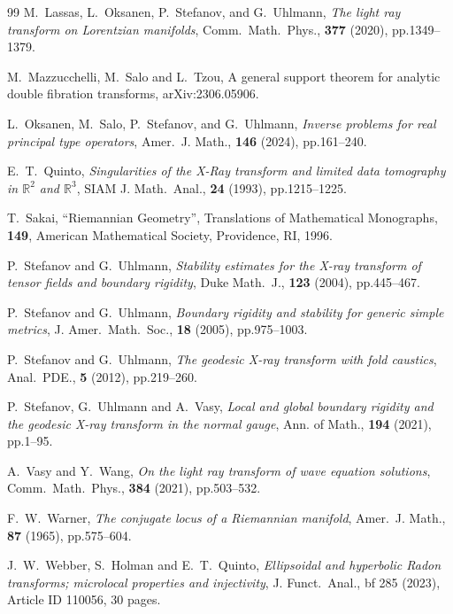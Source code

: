 \documentclass[a4paper,11pt,reqno]{amsart}
\theoremstyle{definition}
\theoremstyle{remark}
\begin{document}
\begin{thebibliography}{99}
M.~Lassas, L.~Oksanen, P.~Stefanov, and G.~Uhlmann, 
{\it The light ray transform on Lorentzian manifolds}, 
Comm.\ Math.\ Phys., {\bf 377} (2020), pp.1349--1379. 

M.~Mazzucchelli, M.~Salo and L.~Tzou, 
{A general support theorem for analytic double fibration transforms}, 
arXiv:2306.05906.

L.~Oksanen, M.~Salo, P.~Stefanov, and G.~Uhlmann, 
{\it Inverse problems for real principal type operators}, 
Amer.\ J. Math., {\bf 146} (2024), pp.161--240. 

E.~T.~Quinto, 
{\it Singularities of the X-Ray transform and limited data tomography in $\mathbb{R}^2$ and $\mathbb{R}^3$}, 
SIAM J. Math.\ Anal., {\bf 24} (1993), pp.1215--1225. 

T.~Sakai, 
``Riemannian Geometry'', 
Translations of Mathematical Monographs, {\bf 149}, 
American Mathematical Society, 
Providence, RI, 1996.

P.~Stefanov and G.~Uhlmann, 
{\it Stability estimates for the X-ray transform of tensor fields and boundary rigidity}, 
Duke Math.\ J., {\bf 123} (2004), pp.445--467.

P.~Stefanov and G.~Uhlmann, 
{\it Boundary rigidity and stability for generic simple metrics}, 
J. Amer.\ Math.\ Soc., {\bf 18} (2005), pp.975--1003.

P.~Stefanov and G.~Uhlmann, 
{\it The geodesic X-ray transform with fold caustics}, 
Anal.\ PDE., {\bf 5} (2012), pp.219--260.

P.~Stefanov, G.~Uhlmann and A.~Vasy, 
{\it Local and global boundary rigidity and the geodesic X-ray transform in the normal gauge}, Ann. of Math., {\bf 194} (2021), pp.1--95.

A.~Vasy and Y.~Wang, 
{\it On the light ray transform of wave equation solutions}, 
Comm.\ Math.\ Phys., {\bf 384} (2021), pp.503--532.

F.~W.~Warner, 
{\it The conjugate locus of a Riemannian manifold}, 
Amer.\ J. Math., {\bf 87} (1965), pp.575--604.

J.~W.~Webber, S.~Holman and E.~T.~Quinto, 
{\it Ellipsoidal and hyperbolic Radon transforms;
microlocal properties and injectivity}, 
J. Funct.\ Anal., {bf 285} (2023), Article ID 110056, 30 pages. 
\end{thebibliography}
\end{document}
